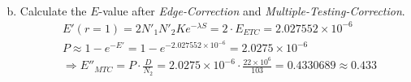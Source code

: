 \documentclass{article}
\begin{document}
\begin{flushleft}
\begin{enumerate}[(a)]
\begin{align*}
    \end{align*}     
    \item Calculate the $E$-value after \textit{Edge-Correction} and \textit{Multiple-Testing-Correction}.
    \begin{align*}
        &E'(r = 1) = 2 N'_1 N'_2 K e^{-\lambda S} = 2 \cdot E_{ETC} = 2.027552 \times 10^{-6} \\
        &P \approx 1 - e^{-E'} = 1 - e^{-2.027552 \times 10^{-6}} =2.0275 \times 10^{-6} \\
        &\Longrightarrow E''_{MTC} = P \cdot \frac{D}{N_2} = 2.0275 \times 10^{-6} \cdot \frac{22 \times 10^6}{103} = 0.4330689 \approx 0.433  
    \end{align*}   
\end{enumerate}
\end{flushleft}
\end{document}
